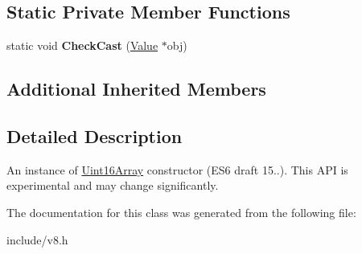 \subsection*{Static Private Member Functions}
\begin{DoxyCompactItemize}
\item 
static void {\bfseries Check\+Cast} (\hyperlink{classv8_1_1_value}{Value} $\ast$obj)\hypertarget{classv8_1_1_uint16_array_ae4758023e65167815dd9ad70df1546f4}{}\label{classv8_1_1_uint16_array_ae4758023e65167815dd9ad70df1546f4}

\end{DoxyCompactItemize}
\subsection*{Additional Inherited Members}


\subsection{Detailed Description}
An instance of \hyperlink{classv8_1_1_uint16_array}{Uint16\+Array} constructor (E\+S6 draft 15..). This A\+PI is experimental and may change significantly. 

The documentation for this class was generated from the following file\+:\begin{DoxyCompactItemize}
\item 
include/v8.\+h\end{DoxyCompactItemize}
